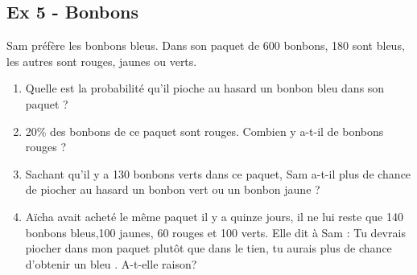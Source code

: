 \documentclass[11pt]{article}
\begin{document}
\begin{multicols}{2}
  \subsection*{Ex 5 - Bonbons}
  Sam préfère les bonbons bleus. 
  Dans son paquet de 600 bonbons, 180 sont bleus, les autres sont rouges, jaunes ou verts.

  \begin{enumerate}
  \item Quelle est la probabilité qu’il pioche au hasard un bonbon bleu dans son paquet ?
  \item 20\% des bonbons de ce paquet sont rouges. Combien y a-t-il de bonbons rouges ?
  \item Sachant qu’il y a 130 bonbons verts dans ce paquet, Sam a-t-il plus de chance de piocher au hasard un bonbon vert ou un bonbon jaune ?
  \item Aïcha avait acheté le même paquet il y a quinze jours, il ne lui reste que 140 bonbons bleus,100 jaunes, 60 rouges et 100 verts. Elle dit à Sam : \og Tu devrais piocher dans mon paquet plutôt que dans le tien, tu aurais plus de chance d’obtenir un bleu \fg.
    A-t-elle raison? 
  \end{enumerate}
\end{multicols}
\end{document}
